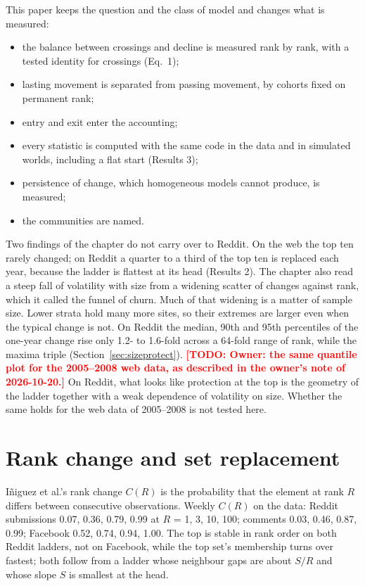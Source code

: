 \documentclass[10pt]{article}
\newcommand{\todo}[1]{\textcolor{red}{\textbf{[TODO: #1]}}}
\begin{document}
This paper keeps the question and the class of model and changes what is measured:
\begin{itemize}
\item the balance between crossings and decline is measured rank by rank, with a tested identity for crossings (Eq.~1);
\item lasting movement is separated from passing movement, by cohorts fixed on permanent rank;
\item entry and exit enter the accounting;
\item every statistic is computed with the same code in the data and in simulated worlds, including a flat start (Results 3);
\item persistence of change, which homogeneous models cannot produce, is measured;
\item the communities are named.
\end{itemize}

Two findings of the chapter do not carry over to Reddit. On the web the top ten rarely changed; on Reddit a quarter to a third of the top ten is replaced each year, because the ladder is flattest at its head (Results 2). The chapter also read a steep fall of volatility with size from a widening scatter of changes against rank, which it called the funnel of churn. Much of that widening is a matter of sample size. Lower strata hold many more sites, so their extremes are larger even when the typical change is not. On Reddit the median, 90th and 95th percentiles of the one-year change rise only 1.2- to 1.6-fold across a 64-fold range of rank, while the maxima triple (Section~\ref{sec:sizeprotect}). \todo{Owner: the same quantile plot for the 2005--2008 web data, as described in the owner's note of 2026-10-20.} On Reddit, what looks like protection at the top is the geometry of the ladder together with a weak dependence of volatility on size. Whether the same holds for the web data of 2005--2008 is not tested here.
\fi

\section{Rank change and set replacement}
Iñiguez et al.'s rank change $C(R)$ is the probability that the element at rank $R$ differs between consecutive observations. Weekly $C(R)$ on the data: Reddit submissions 0.07, 0.36, 0.79, 0.99 at $R$ = 1, 3, 10, 100; comments 0.03, 0.46, 0.87, 0.99; Facebook 0.52, 0.74, 0.94, 1.00. The top is stable in rank order on both Reddit ladders, not on Facebook, while the top set's membership turns over fastest; both follow from a ladder whose neighbour gaps are about $S/R$ and whose slope $S$ is smallest at the head.
\end{document}
